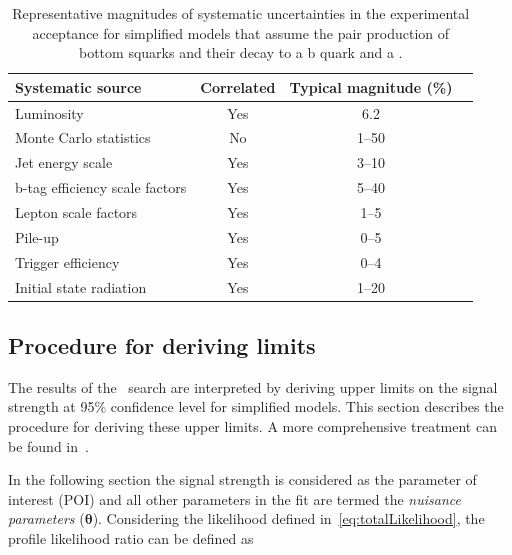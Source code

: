 \begin{table}[h!]
  \caption{
    Representative magnitudes of systematic uncertainties in the
    experimental acceptance for simplified models that assume the 
    pair production of bottom squarks and their decay to a b
    quark and a \chiz.}  
  \label{tab:signal_systs}
  \centering
  \footnotesize
  \begin{tabular}{ lccc }
    \hline
    Systematic source\T\B          & Correlated & Typical magnitude (\%) \\
    \hline
    Luminosity\T                   & Yes        & 6.2                    \\
    Monte Carlo statistics         & No         & 1--50                  \\
    Jet energy scale               & Yes        & 3--10                  \\
    b-tag efficiency scale factors & Yes        & 5--40                  \\
    Lepton scale factors           & Yes        & 1--5                   \\
    Pile-up                        & Yes        & 0--5                   \\
    Trigger efficiency             & Yes        & 0--4                   \\
    Initial state radiation        & Yes        & 1--20                  \\
    \hline
  \end{tabular}
\end{table}

\subsection{Procedure for deriving limits}
\label{sec:limits}
The results of the \alphat~search are interpreted by deriving upper limits on the signal strength
at 95\% confidence level for simplified models. This section describes the procedure for deriving
these upper limits. A more comprehensive treatment can be found in~\cite{asymp}.

In the following section the signal strength is considered as the parameter of interest (POI)
and all other parameters in the fit are termed the \emph{nuisance parameters} ($\boldsymbol{\theta}$). Considering
the likelihood defined in~\ref{eq:totalLikelihood}, the profile likelihood ratio can be defined as

